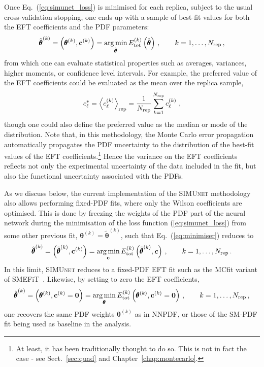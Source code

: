 \documentclass[withindex,glossary]{cam-thesis}
\renewcommand{\vec}[1]{\textbf{#1}} %
\newcommand{\simunet}{\textsc{SIMUnet}}
\DeclareMathOperator*{\argmin}{arg\,min}
\begin{document}
%
Once Eq.~(\ref{eq:simunet_loss}) is minimised for each replica, subject
to the usual cross-validation stopping, one ends up with a sample of
best-fit values for both the EFT
coefficients and the PDF parameters:
\begin{equation}
  \label{eq:minimiser}
  \hat{\pmb{\theta}}^{(k)}
  = \left( \pmb{\theta}^{(k)}, \vec{c}^{(k)}  \right)
  = \argmin_{\hat{\pmb{\theta}}}  E_{\rm tot}^{(k)}\left( \hat{\pmb{\theta}}\right)  \, ,\qquad k=1,\ldots, N_{\rm rep} \, ,
\end{equation}
from which one can evaluate statistical properties such as averages,
variances, higher moments, or confidence level intervals.
For example, the preferred value of the EFT coefficients
could be evaluated as the mean over the replica sample,
\begin{equation}
  c_\ell^* = \left\langle c_\ell^{(k)} \right\rangle_{\rm rep} =
  \frac{1}{N_{\rm rep}}\sum_{k=1}^{N_{\rm rep}}  c_\ell^{(k)}
  \ ,
\end{equation}
though one could also define the preferred value as the median or mode
of the distribution. Note that, in this methodology, the Monte Carlo
error propagation automatically propagates the PDF uncertainty to the
distribution of the best-fit values of the EFT
coefficients.\footnote{At least, it has been traditionally thought to do so. 
This is not in fact the case - see Sect.~\ref{sec:quad} and Chapter~\ref{chap:montecarlo}.} Hence the variance on the EFT coefficients reflects not
only the experimental uncertainty of the data included in the fit, but
also the functional uncertainty associated with the PDFs.

As we discuss below, the current implementation of the 
\simunet{} methodology also allows performing fixed-PDF fits, where
only the Wilson coefficients are optimised. This is done by freezing the weights
 of the PDF part of the neural network during the minimisation of the loss function
 (\ref{eq:simunet_loss}) from some other previous fit, $\boldsymbol{{\theta}}^{(k)}=
 \boldsymbol{\widetilde{\theta}}^{(k)}$, such that Eq.~(\ref{eq:minimiser})
 reduces to
 \begin{equation}
  \label{eq:minimiser2}
  \hat{\pmb{\theta}}^{(k)}
  = \left( \tilde{\pmb{\theta}}^{(k)}, \vec{c}^{(k)}  \right)
  = \argmin_{\vec{c}}  E_{\rm tot}^{(k)}\left( \tilde{\pmb{\theta}}^{(k)},
    \boldsymbol{c} \right)  \, ,\qquad k=1,\ldots, N_{\rm rep} \, .
 \end{equation}
In this limit, \simunet{} reduces to a fixed-PDF EFT fit such as the
 MCfit variant of {\sc\small SMEFiT}~\cite{Giani:2023gfq}. 
 Likewise, by setting to zero the EFT coefficients,
 \begin{equation}
  \label{eq:minimiser3}
  \hat{\pmb{\theta}}^{(k)}
  = \left( \pmb{\theta}^{(k)}, \vec{c}^{(k)} =\vec{0} \right)
  = \argmin_{\pmb{\theta}}  E_{\rm tot}^{(k)}\left( \pmb{\theta}^{(k)},
    \vec{c}^{(k)}=\vec{0} \right)  \, ,\qquad k=1,\ldots, N_{\rm rep} \, ,
 \end{equation}
 one recovers the same PDF weights $\pmb{\theta}^{(k)}$
 as in NNPDF, or those of the SM-PDF fit being used as baseline in
 the analysis. 
\end{document}

